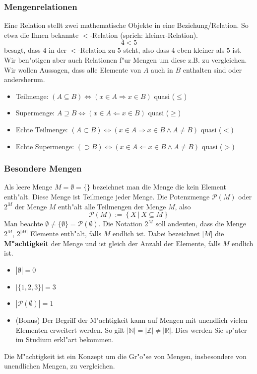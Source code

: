 \subsubsection{Mengenrelationen}
Eine Relation stellt zwei mathematische Objekte in eine Beziehung/Relation. So etwa die Ihnen bekannte $<$-Relation (sprich: kleiner-Relation).
\begin{equation*}
4 < 5
\end{equation*}
besagt, dass $4$ in der $<$-Relation zu $5$ steht, also dass $4$ eben kleiner als $5$ ist. Wir ben"otigen aber auch Relationen f"ur Mengen um diese z.B. zu vergleichen. Wir wollen Aussagen, dass alle Elemente von $A$ auch in $B$ enthalten sind oder andersherum.
\begin{itemize}
\item Teilmenge: $(A \subseteq B) \iff (x \in A \Rightarrow x \in B)$ quasi ($\leq$)
\item Supermenge: $A \supseteq B  \iff (x \in A \Leftarrow x \in B)$ quasi ($\geq$)
\item Echte Teilmenge: $(A \subset B) \iff (x \in A \Rightarrow x \in B \land A \neq B)$ quasi ($<$)
\item Echte Supermenge: $(\supset B) \iff (x \in A \Leftarrow x \in B \land A \neq B)$ quasi ($>$)
\end{itemize}

\subsubsection{Besondere Mengen}
Als leere Menge $M = \emptyset = \{\}$ bezeichnet man die Menge die kein Element enth"alt. Diese Menge ist Teilmenge jeder Menge. Die Potenzmenge $\mathcal{P}(M)$ oder $2^M$ der Menge $M$ enth"alt alle Teilmengen der Menge $M$, also
\begin{equation*}
\mathcal{P}(M) := \left\{X \ | \ X \subseteq M \right\}
\end{equation*}
Man beachte $\emptyset \neq \{ \emptyset \} = \mathcal{P}(\emptyset)$. Die Notation $2^M$ soll andeuten, dass die Menge $2^M$, $2^{|M|}$ Elemente enth"alt, falls $M$ endlich ist. Dabei bezeichnet $|M|$ die \textbf{M"achtigkeit} der Menge und ist gleich der Anzahl der Elemente, falls $M$ endlich ist.
\begin{itemize}
\item $|\emptyset| = 0$
\item $|\{1, 2, 3\}| = 3$
\item $|\mathcal{P}(\emptyset)| = 1$
\item (Bonus) Der Begriff der M"achtigkeit kann auf Mengen mit unendlich vielen Elementen erweitert werden. So gilt $|\mathbb{N}| = |\mathbb{Z}| \neq |\mathbb{R}|$. Dies werden Sie sp"ater im Studium erkl"art bekommen.
\end{itemize}
Die M"achtigkeit ist ein Konzept um die Gr"o"se von Mengen, insbesondere von unendlichen Mengen, zu vergleichen.